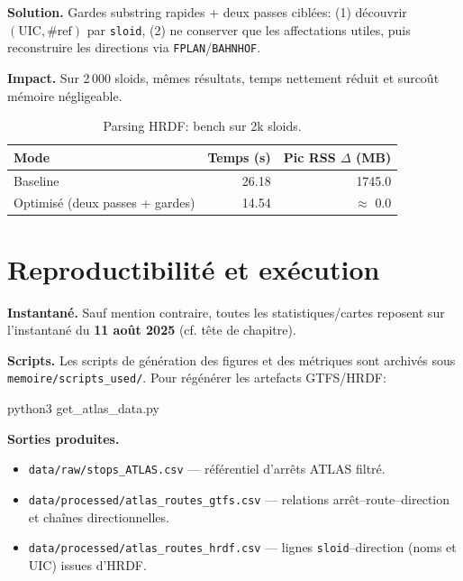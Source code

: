 \textbf{Solution.} Gardes substring rapides + deux passes ciblées: (1) découvrir \((\text{UIC}, \#\text{ref})\) par \texttt{sloid}, (2) ne conserver que les affectations utiles, puis reconstruire les directions via \texttt{FPLAN}/\texttt{BAHNHOF}.

\textbf{Impact.} Sur 2\,000 sloids, mêmes résultats, temps nettement réduit et surcoût mémoire négligeable.

\begin{table}[h]
  \centering
  \begin{tabular}{lrr}
    \toprule
    \textbf{Mode} & \textbf{Temps (s)} & \textbf{Pic RSS $\Delta$ (MB)} \\
    \midrule
    Baseline & 26.18 & 1745.0 \\
    Optimisé (deux passes + gardes) & 14.54 & $\approx$ 0.0 \\
    \bottomrule
  \end{tabular}
  \caption[Bench HRDF (2k sloids)]{Parsing HRDF: bench sur 2k sloids.}
  \label{tab:hrdf-bench-ch1}
\end{table}

\section{Reproductibilité et exécution}
\noindent\textbf{Instantané.} Sauf mention contraire, toutes les statistiques/cartes reposent sur l’instantané du \textbf{11 août 2025} (cf. tête de chapitre).\medskip

\noindent\textbf{Scripts.} Les scripts de génération des figures et des métriques sont archivés sous \texttt{memoire/scripts\_used/}. Pour régénérer les artefacts GTFS/HRDF:

\begin{cmdbox}
python3 get_atlas_data.py
\end{cmdbox}

\noindent\textbf{Sorties produites.}
\begin{itemize}
  \item \texttt{data/raw/stops\_ATLAS.csv} — référentiel d’arrêts ATLAS filtré.
  \item \texttt{data/processed/atlas\_routes\_gtfs.csv} — relations arrêt–route–direction et chaînes directionnelles.
  \item \texttt{data/processed/atlas\_routes\_hrdf.csv} — lignes \texttt{sloid}–direction (noms et UIC) issues d’HRDF.
\end{itemize}

